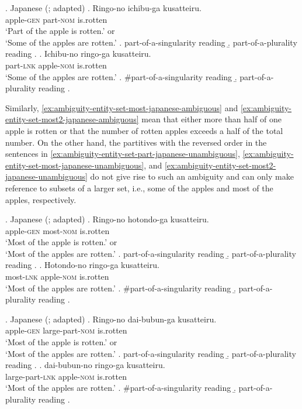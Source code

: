 \ex.\label{ex:ambiguity-entity-set-part-japanese} Japanese (\citealt{watanabe2017mass}; adapted)
\ag. Ringo-no ichibu-ga kusatteiru.\label{ex:ambiguity-entity-set-part-japanese-ambiguous}\\
apple-\textsc{gen} part-\textsc{nom} is.rotten\\
`Part of the apple is rotten.' or
\\`Some of the apples are rotten.'
\a. part-of-a-singularity reading
\b. part-of-a-plurality reading
\z.
\bg. Ichibu-no ringo-ga kusatteiru.\label{ex:ambiguity-entity-set-part-japanese-unambiguous}\\
part-\textsc{lnk} apple-\textsc{nom} is.rotten\\
`Some of the apples are rotten.'
\a. \#part-of-a-singularity reading\label{notation-explained}
\b. part-of-a-plurality reading
\z.

Similarly, \ref{ex:ambiguity-entity-set-most-japanese-ambiguous} and \ref{ex:ambiguity-entity-set-most2-japanese-ambiguous} mean that either more than half of one apple is rotten or that the number of rotten apples exceeds a half of the total number. On the other hand, the partitives with the reversed order in the sentences in \ref{ex:ambiguity-entity-set-part-japanese-unambiguous}, \ref{ex:ambiguity-entity-set-most-japanese-unambiguous}, and \ref{ex:ambiguity-entity-set-most2-japanese-unambiguous} do not give rise to such an ambiguity and can only make reference to subsets of a larger set, i.e., some of the apples and most of the apples, respectively.

\ex.\label{ex:ambiguity-entity-set-most-japanese} Japanese (\citealt{watanabe2017mass}; adapted)
\ag. Ringo-no hotondo-ga kusatteiru.\label{ex:ambiguity-entity-set-most-japanese-ambiguous}\\
apple-\textsc{gen} most-\textsc{nom} is.rotten\\
`Most of the apple is rotten.' or\\`Most of the apples are rotten.'
\a. part-of-a-singularity reading
\b. part-of-a-plurality reading
\z.
\bg. Hotondo-no ringo-ga kusatteiru.\label{ex:ambiguity-entity-set-most-japanese-unambiguous}\\
most-\textsc{lnk} apple-\textsc{nom} is.rotten\\
`Most of the apples are rotten.'
\a. \#part-of-a-singularity reading
\b. part-of-a-plurality reading
\z.

\ex.\label{ex:ambiguity-entity-set-most2-japanese} Japanese (\citealt{watanabe2017mass}; adapted)
\ag. Ringo-no dai-bubun-ga kusatteiru.\label{ex:ambiguity-entity-set-most2-japanese-ambiguous}\\
apple-\textsc{gen} large-part-\textsc{nom} is.rotten\\
`Most of the apple is rotten.' or\\`Most of the apples are rotten.'
\a. part-of-a-singularity reading
\b. part-of-a-plurality reading
\z.
\bg. dai-bubun-no ringo-ga kusatteiru.\label{ex:ambiguity-entity-set-most2-japanese-unambiguous}\\
large-part-\textsc{lnk} apple-\textsc{nom} is.rotten\\
`Most of the apples are rotten.'
\a. \#part-of-a-singularity reading
\b. part-of-a-plurality reading
\z.

